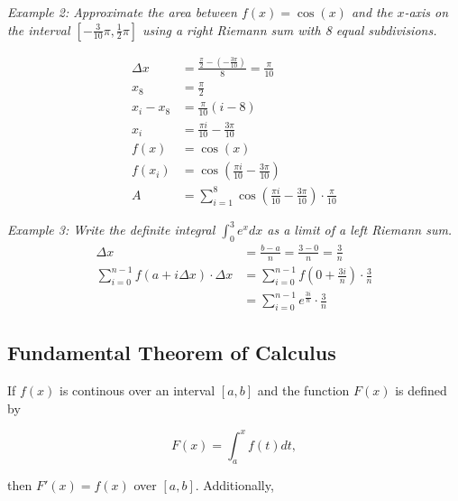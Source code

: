         \noindent \color{blue} \textit{Example 2: Approximate the area between $f(x)=\cos{(x)}$
        and the $x$-axis on the interval $\left[-\frac{3}{10}\pi, \frac{1}{2}\pi\right]$ using
        a right Riemann sum with 8 equal subdivisions.} \color{black}

        \begin{align*}
            \Delta x    &= \frac{\frac{\pi}{2}-\left(-\frac{3\pi}{10}\right)}{8} = \frac{\pi}{10} \\
            x_8         &= \frac{\pi}{2} \\
            x_i - x_8   &= \frac{\pi}{10} (i-8) \\
            x_i         &= \frac{\pi i}{10} - \frac{3\pi}{10} \\
            f(x)        &= \cos{(x)} \\
            f(x_i)      &= \cos{\left(\frac{\pi i}{10}-\frac{3\pi}{10}\right)} \\
            A           &= \sum^8_{i=1}\cos{\left(\frac{\pi i}{10}-\frac{3\pi}{10}\right)}
            \cdot\frac{\pi}{10}
        \end{align*}

        \noindent \color{blue} \textit{Example 3: Write the definite integral $\int^3_0 e^x dx$
        as a limit of a left Riemann sum.} \color{black} \\

        \begin{align*}
            \Delta x                                    &= \frac{b-a}{n} = \frac{3-0}{n} = \frac{3}{n} \\
            \sum^{n-1}_{i=0}f(a+i\Delta x)\cdot\Delta x &= \sum^{n-1}_{i=0} f\left(0+\frac{3i}{n}\right)
            \cdot \frac{3}{n} \\
            &= \sum^{n-1}_{i=0} e^{\frac{3i}{n}}\cdot\frac{3}{n}
        \end{align*}


    \subsection{Fundamental Theorem of Calculus}
        If $f(x)$ is continous over an interval $[a,b]$ and the function $F(x)$ is defined by

        \begin{equation*}
            F(x) = \int^x_a f(t)dt,
        \end{equation*}

        \noindent then $F'(x)=f(x)$ over $[a,b]$. Additionally, \\

